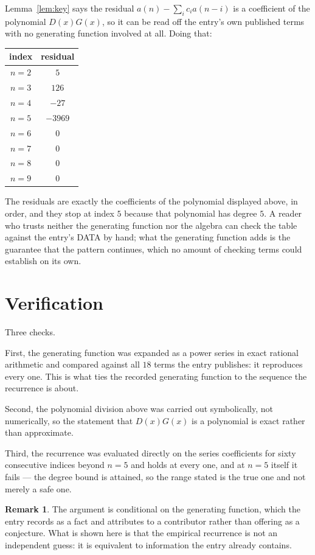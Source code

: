 \documentclass[11pt,a4paper]{article}
\theoremstyle{plain}
\theoremstyle{definition}
\newtheorem{remark}[theorem]{Remark}
\begin{document}
Lemma~\ref{lem:key} says the residual $a(n)-\sum_ic_ia(n-i)$ is a coefficient of the
polynomial $D(x)G(x)$, so it can be read off the entry's own published terms with no
generating function involved at all. Doing that:
\begin{center}
\begin{tabular}{cc}
index & residual \\ \hline
$n=2$ & $5$ \\
$n=3$ & $126$ \\
$n=4$ & $-27$ \\
$n=5$ & $-3969$ \\
$n=6$ & $0$ \\
$n=7$ & $0$ \\
$n=8$ & $0$ \\
$n=9$ & $0$
\end{tabular}
\end{center}
The residuals are exactly the coefficients of the polynomial displayed above, in order, and
they stop at index $5$ because that polynomial has degree $5$. A reader who trusts
neither the generating function nor the algebra can check the table against the entry's DATA
by hand; what the generating function adds is the guarantee that the pattern continues, which
no amount of checking terms could establish on its own.

\section{Verification}

Three checks.

First, the generating function was expanded as a power series in exact rational arithmetic and
compared against all $18$ terms the entry publishes: it reproduces every one. This is
what ties the recorded generating function to the sequence the recurrence is about.

Second, the polynomial division above was carried out symbolically, not numerically, so the
statement that $D(x)G(x)$ is a polynomial is exact rather than approximate.

Third, the recurrence was evaluated directly on the series coefficients for sixty consecutive
indices beyond $n=5$ and holds at every one, and at $n=5$ itself it fails --- the
degree bound is attained, so the range stated is the true one and not merely a safe one.

\begin{remark}
The argument is conditional on the generating function, which the entry records as a fact and
attributes to a contributor rather than offering as a conjecture. What is shown here is that
the empirical recurrence is not an independent guess: it is equivalent to information the
entry already contains.
\end{remark}
\end{document}
